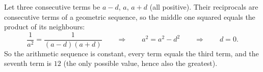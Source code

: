 Let three consecutive terms be $a-d$, $a$, $a+d$ (all positive). Their reciprocals are consecutive terms of a geometric sequence, so the middle one squared equals the product of its neighbours:
\[
\dfrac{1}{a^2}=\dfrac{1}{(a-d)(a+d)}\qquad\Longrightarrow\qquad a^2=a^2-d^2\qquad\Longrightarrow\qquad d=0 .
\]
So the arithmetic sequence is constant, every term equals the third term, and the seventh term is $\boxed{12}$ (the only possible value, hence also the greatest).
